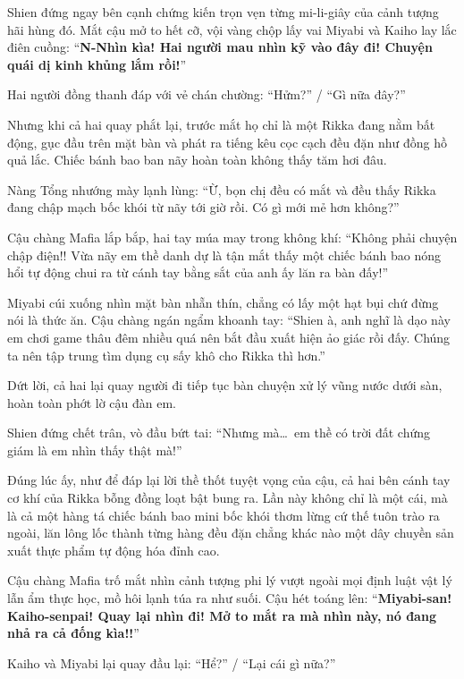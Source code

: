 \documentclass[../main.tex]{subfiles}
\begin{document}
Shien đứng ngay bên cạnh chứng kiến trọn vẹn từng mi-li-giây của cảnh tượng hãi hùng đó. Mắt cậu mở to hết cỡ, vội vàng chộp lấy vai Miyabi và Kaiho lay lắc điên cuồng: ``\textbf{N-Nhìn kìa! Hai người mau nhìn kỹ vào đây đi! Chuyện quái dị kinh khủng lắm rồi!}''

Hai người đồng thanh đáp với vẻ chán chường: ``Hửm?'' / ``Gì nữa đây?''

Nhưng khi cả hai quay phắt lại, trước mắt họ chỉ là một Rikka đang nằm bất động, gục đầu trên mặt bàn và phát ra tiếng kêu cọc cạch đều đặn như đồng hồ quả lắc. Chiếc bánh bao ban nãy hoàn toàn không thấy tăm hơi đâu.

Nàng Tổng nhướng mày lạnh lùng: ``Ừ, bọn chị đều có mắt và đều thấy Rikka đang chập mạch bốc khói từ nãy tới giờ rồi. Có gì mới mẻ hơn không?''

Cậu chàng Mafia lắp bắp, hai tay múa may trong không khí: ``Không phải chuyện chập điện!! Vừa nãy em thề danh dự là tận mắt thấy một chiếc bánh bao nóng hổi tự động chui ra từ cánh tay bằng sắt của anh ấy lăn ra bàn đấy!''

Miyabi cúi xuống nhìn mặt bàn nhẵn thín, chẳng có lấy một hạt bụi chứ đừng nói là thức ăn. Cậu chàng ngán ngẩm khoanh tay: ``Shien à, anh nghĩ là dạo này em chơi game thâu đêm nhiều quá nên bắt đầu xuất hiện ảo giác rồi đấy. Chúng ta nên tập trung tìm dụng cụ sấy khô cho Rikka thì hơn.''

Dứt lời, cả hai lại quay người đi tiếp tục bàn chuyện xử lý vũng nước dưới sàn, hoàn toàn phớt lờ cậu đàn em.

Shien đứng chết trân, vò đầu bứt tai: ``Nhưng mà\dots\ em thề có trời đất chứng giám là em nhìn thấy thật mà!''

Đúng lúc ấy, như để đáp lại lời thề thốt tuyệt vọng của cậu, cả hai bên cánh tay cơ khí của Rikka bỗng đồng loạt bật bung ra. Lần này không chỉ là một cái, mà là cả một hàng tá chiếc bánh bao mini bốc khói thơm lừng cứ thế tuôn trào ra ngoài, lăn lông lốc thành từng hàng đều đặn chẳng khác nào một dây chuyền sản xuất thực phẩm tự động hóa đỉnh cao.


Cậu chàng Mafia trố mắt nhìn cảnh tượng phi lý vượt ngoài mọi định luật vật lý lẫn ẩm thực học, mồ hôi lạnh túa ra như suối. Cậu hét toáng lên: ``\textbf{Miyabi-san! Kaiho-senpai! Quay lại nhìn đi! Mở to mắt ra mà nhìn này, nó đang nhả ra cả đống kìa!!}''

Kaiho và Miyabi lại quay đầu lại: ``Hể?'' / ``Lại cái gì nữa?''
\end{document}
